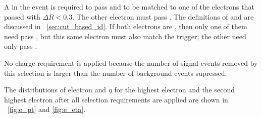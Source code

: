 A \CentralElectron in the event is required to pass \EGTIGHT and to be matched
to one of the electrons that passed \SingleElectronTrigger with $\Delta R <
0.3$. The other electron must pass \EGMEDIUM. The definitions of \EGMEDIUM and
\EGTIGHT are discussed in \SEC~\ref{sec:cut_based_id}. If both electrons are
\CentralElectrons, then only one of them need pass \EGTIGHT, but this same
electron must also match the trigger; the other \CentralElectron need only pass
\EGMEDIUM.

No charge requirement is applied because the number of signal events removed by
this selection is larger than the number of background events supressed.

The distributions of electron \pt and $\eta$ for the highest \pt electron and
the second highest \pt electron after all selection requirements are applied
are shown in \FIGS~\ref{fig:e_pt} and \ref{fig:e_eta}.

